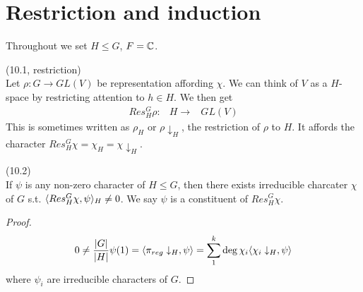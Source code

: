\documentclass[a4paper]{article}
\begin{document}
\newpage
\section{Restriction and induction}
Throughout we set $H \leq G$, $F = \mathbb{C}$.

\begin{defi} (10.1, restriction)\\
Let $\rho:G \to GL(V)$ be representation affording $\chi$. We can think of $V$ as a $H$-space by restricting attention to $h \in H$. We then get
\begin{equation*}
\begin{aligned}
Res_H^G \rho : &H \to &GL(V)
\end{aligned}
\end{equation*}
This is sometimes written as $\rho_H$ or $\rho\downarrow_H$, the restriction of $\rho$ to $H$. It affords the character $Res_H^G \chi = \chi_H = \chi \downarrow_H$.
\end{defi}

\begin{lemma} (10.2)\\
If $\psi$ is any non-zero character of $H \leq G$, then there exists irreducible charcater $\chi$ of $G$ s.t. $\langle Res_H^G \chi, \psi \rangle_H \neq 0$. We say $\psi$ is a constituent of $Res_H^G \chi$.
\begin{proof}
\begin{equation*}
\begin{aligned}
0 \neq \frac{|G|}{|H|} \psi(1) = \langle \pi_{reg} \downarrow_H ,\psi\rangle = \sum_1^k \deg \chi_i \langle \chi_i \downarrow_H ,\psi\rangle
\end{aligned}
\end{equation*}
where $\psi_i$ are irreducible characters of $G$.
\end{proof}
\end{lemma}
\end{document}

